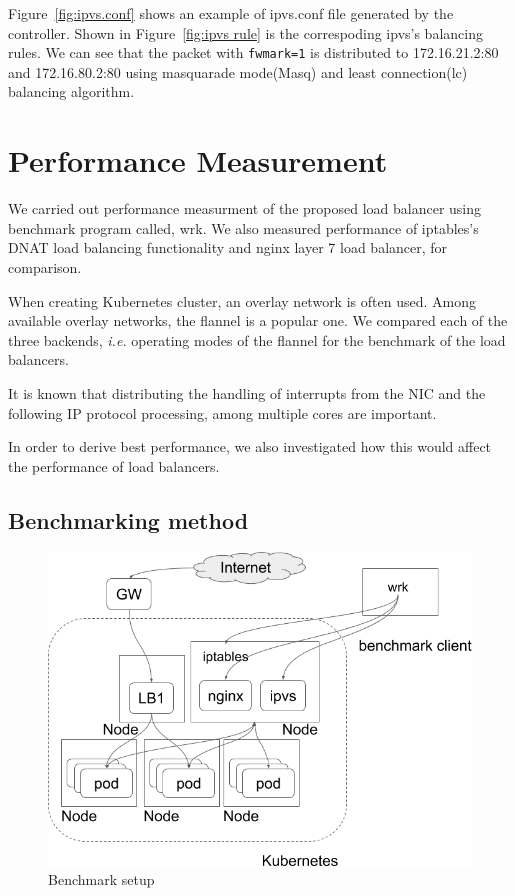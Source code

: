 Figure~\ref{fig:ipvs.conf} shows an example of ipvs.conf file generated by the controller. 
Shown in Figure~\ref{fig:ipvs rule} is the correspoding ipvs's balancing rules.
We can see that the packet with {\tt fwmark=1}\cite{BertHubert2002} is distributed to 172.16.21.2:80 and 172.16.80.2:80 
using masquarade mode(Masq)\cite{Zhang2000} and least connection(lc)\cite{Zhang2000} balancing algorithm.   

\section{Performance Measurement}\label{Performance Measurement}

We carried out performance measurment of the proposed load balancer using benchmark program called, wrk\cite{Glozer2016}.
We also measured performance of iptables's DNAT load balancing functionality and nginx layer 7 load balancer, for comparison.

When creating Kubernetes cluster, an overlay network\cite{Sill2016,Marmol2015} is often used. 
Among available overlay networks, the flannel\cite{CoreOSFlannel} is a popular one.
We compared each of the three backends\cite{CoreOSFlannelBackend}, {\it i.e.} operating modes of the flannel for the benchmark of the load balancers.

It is known that distributing the handling of interrupts from the NIC 
and the following IP protocol processing, among multiple cores are important.

In order to derive best performance, we also investigated how this would affect the performance of load balancers.

\subsection{Benchmarking method}

\begin{figure}
\includegraphics[width=\columnwidth]{Figs/benchmark-schem}
\caption{Benchmark setup}
\label{fig:benchmark-schem}
\end{figure}

